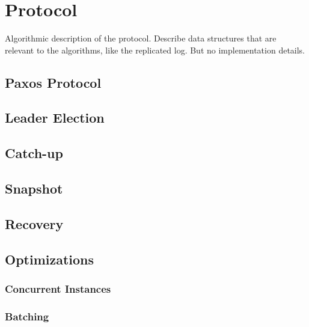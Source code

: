 \section{Protocol}
Algorithmic description of the protocol. 
Describe data structures that are relevant to the algorithms, 
like the replicated log.
But no implementation details.

\subsection{Paxos Protocol}

\subsection{Leader Election}

\subsection{Catch-up}

\subsection{Snapshot}

\subsection{Recovery}

\subsection{Optimizations}

\subsubsection{Concurrent Instances}

\subsubsection{Batching}

